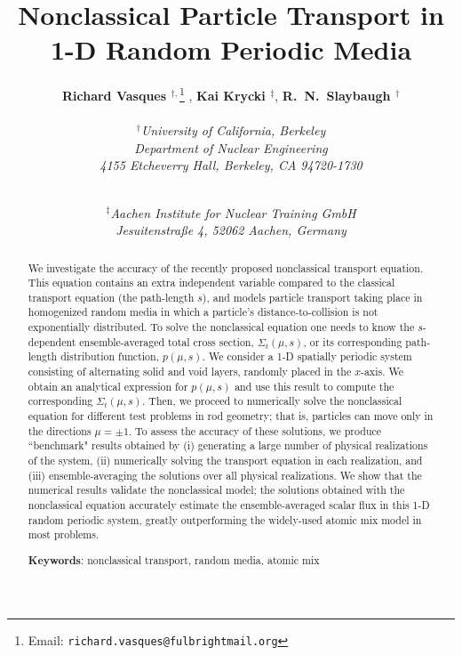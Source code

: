 \documentclass[12pt]{article}
\newcommand{\Keywords}[1]{\vspace{12pt}\par\noindent
{\small{\bf Keywords\/}: #1}}
\begin{document}
\title{Nonclassical Particle Transport in 1-D Random Periodic Media}
\author{{\bf Richard Vasques $^{\dagger,}$}\footnote{Email: \texttt{richard.vasques@fulbrightmail.org}} , {\bf Kai Krycki $^\ddagger$}, {\bf R.\ N.\ Slaybaugh $^\dagger$}\\ \\
\em {\bf $^\dagger$}University of California, Berkeley\\
\em Department of Nuclear Engineering\\
\em 4155 Etcheverry Hall, Berkeley, CA 94720-1730\\
\and \\
\em {\bf $^\ddagger$}Aachen Institute for Nuclear Training GmbH \\
\em Jesuitenstraße 4, 52062 Aachen, Germany}
\date{}
\maketitle

\begin{abstract}

We investigate the accuracy of the recently proposed nonclassical transport equation.
This equation contains an extra independent variable compared to the classical transport equation (the path-length $s$), and models particle transport taking place in homogenized random media in which a particle's distance-to-collision is not exponentially distributed.
To solve the nonclassical equation one needs to know the $s$-dependent ensemble-averaged total cross section, $\Sigma_t(\mu,s)$, or its corresponding path-length distribution function, $p(\mu,s)$.
We consider a 1-D spatially periodic system consisting of alternating solid and void layers, randomly placed in the $x$-axis.
We obtain an analytical expression for $p(\mu,s)$ and use this result to compute the corresponding $\Sigma_t(\mu,s)$.
Then, we proceed to numerically solve the nonclassical equation for different test problems in rod geometry; that is, particles can move only in the directions $\mu=\pm 1$.
To assess the accuracy of these solutions, we produce ``benchmark" results obtained by (i) generating a large number of physical realizations of the system, (ii) numerically solving the transport equation in each realization, and (iii) ensemble-averaging the solutions over all physical realizations.
We show that the numerical results validate the nonclassical model; the solutions obtained with the nonclassical equation accurately estimate the ensemble-averaged scalar flux in this 1-D random periodic system, greatly outperforming the widely-used atomic mix model in most problems. 

\Keywords{nonclassical transport, random media, atomic mix}
\end{abstract}
\end{document}

